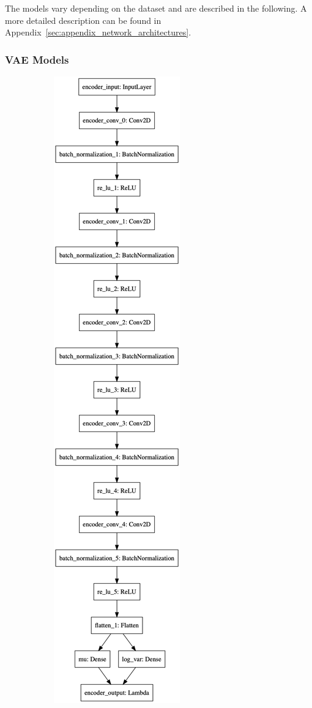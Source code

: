 The models vary depending on the dataset and are described in the following.
A more detailed description can be found in Appendix~\ref{sec:appendix_network_architectures}.

\subsubsection{VAE Models}\label{subsubsec:vae_models}

\begin{figure}
    \centering
    \begin{subfigure}{.5\textwidth}
        \centering
        \includegraphics[width=\textwidth,height=.85\textheight,keepaspectratio]{images/vae/encoder.png}

\end{subfigure}
\end{figure}

